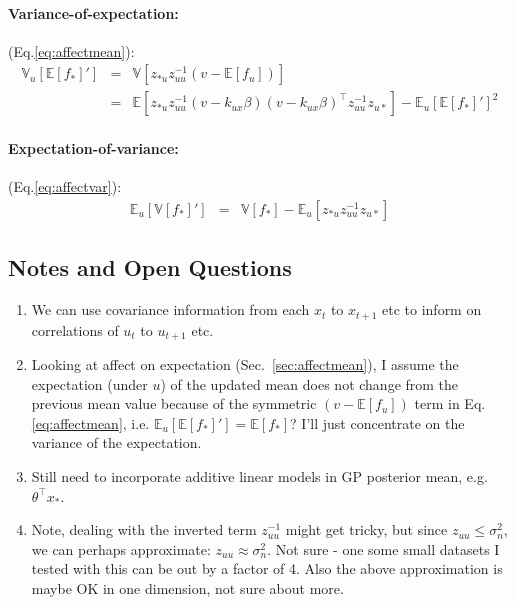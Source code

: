 \documentclass[a4paper,10pt]{article}
\newcommand{\inv}{^{-1}}
\newcommand{\E}{\mathbb{E}}
\newcommand{\V}{\mathbb{V}}
\newcommand{\nnn}{\nonumber \\}
\newcommand{\vv}[2]{\begin{bmatrix} #1 \\ #2 \end{bmatrix}} %
\begin{document}
\paragraph{Variance-of-expectation:} (Eq.\ref{eq:affectmean}):
\begin{eqnarray}
 \V_u[\E[f_*]'] & = & \V[z_{*u}z_{uu}\inv (v - \E[f_u])] \nnn
                & = & \E[z_{*u}z_{uu}\inv (v - k_{ux}\beta)(v - k_{ux}\beta)^\top z_{uu}\inv z_{u*}] -
                      \E_u[\E[f_*]']^2
\end{eqnarray}
\paragraph{Expectation-of-variance:} (Eq.\ref{eq:affectvar}):
\begin{eqnarray}
 \E_u[\V[f_*]'] & = & \V[f_*] - \E_u[z_{*u}z_{uu}\inv z_{u*}]
\end{eqnarray}

\subsection{Notes and Open Questions}\label{sec:notes}

\begin{enumerate}
 \item We can use covariance information from each $x_t$ to $x_{t+1}$ etc
 to inform on correlations of $u_t$ to $u_{t+1}$ etc.
 \item Looking at affect on expectation (Sec.~\ref{sec:affectmean}),
 I assume the expectation (under $u$) of the updated mean does not change from the previous mean value
 because of the symmetric $(v - \E[f_u])$ term in Eq.\ref{eq:affectmean},
 i.e. $\E_u[\E[f_*]'] = \E[f_*]$? I'll just concentrate on the variance of the expectation.
 \item Still need to incorporate additive linear models in GP posterior mean, e.g. $\theta^\top x_*$.
 \item Note, dealing with the inverted term $z_{uu}\inv$ might get tricky,
 but since $z_{uu} \leq \sigma_n^2$,
 we can perhaps approximate: $z_{uu} \approx \sigma_n^2$.
 Not sure - one some small datasets I tested with this can be out by a factor of 4.
 Also the above approximation is maybe OK in one dimension, not sure about more.
\end{enumerate}

\appendix

\newcommand{\mumu}{\vv{\mu}{\mu}}
\newcommand{\xx}{\vv{x}{x'}}
\newcommand{\ttt}{\begin{bmatrix} t \\ t\end{bmatrix}}
\newcommand{\LambdaLambda}{\begin{bmatrix} \Lambda_a & 0 \\ 0 & \Lambda_b \end{bmatrix}}
\newcommand{\SigmaSigma}{\begin{bmatrix} \Sigma & \Sigma \\ \Sigma & \Sigma \end{bmatrix}}
\end{document}
